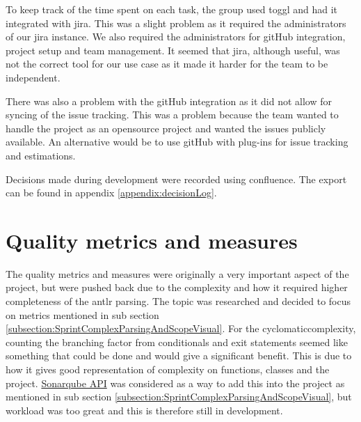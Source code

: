 To keep track of the time spent on each task, the group used \gls{toggl} and had it integrated with \gls{jira}. This was a slight problem as it required the administrators of our \gls{jira} instance. We also required the administrators for \Gls{git}Hub integration, project setup and team management. It seemed that \gls{jira}, although useful, was not the correct tool for our use case as it made it harder for the team to be independent.

There was also a problem with the \Gls{git}Hub integration as it did not allow for syncing of the issue tracking. This was a problem because the team wanted to handle the project as an \gls{opensource} project and wanted the issues publicly available. An alternative would be to use \Gls{git}Hub with plug-ins for issue tracking and estimations.

Decisions made during development were recorded using \gls{confluence}. The export can be found in appendix \ref{appendix:decisionLog}.

\section{Quality metrics and measures}
The quality metrics and measures were originally a very important aspect of the project, but were pushed back due to the complexity and how it required higher completeness of the \gls{antlr} parsing. The topic was researched and decided to focus on metrics mentioned in sub section \ref{subsection:SprintComplexParsingAndScopeVisual}.
For the \Gls{cyclomaticcomplexity}, counting the branching factor from conditionals and exit statements seemed like something that could be done and would give a significant benefit. This is due to how it gives good representation of complexity on functions, classes and the project. \href{https://github.com/SonarSource/sonarqube}{Sonarqube API} was considered as a way to add this into the project as mentioned in sub section \ref{subsection:SprintComplexParsingAndScopeVisual}, but workload was too great and this is therefore still in development.

